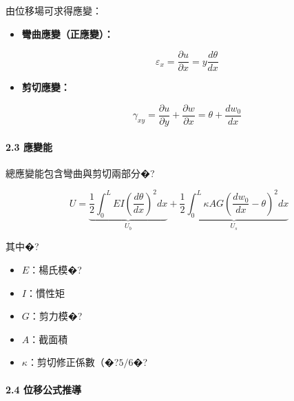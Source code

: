 \documentclass[UTF8, a4paper, 12pt]{ctexart}
\begin{document}
由位移場可求得應變：



\begin{itemize}

    \item \textbf{彎曲應變（正應變）：}

    $$\varepsilon_x = \frac{\partial u}{\partial x} = y \frac{d\theta}{dx}$$

    

    \item \textbf{剪切應變：}

    $$\gamma_{xy} = \frac{\partial u}{\partial y} + \frac{\partial w}{\partial x} = \theta + \frac{dw_0}{dx}$$

\end{itemize}



\paragraph{2.3 應變能}



總應變能包含彎曲與剪切兩部分�?



$$U = \underbrace{\frac{1}{2}\int_0^L EI\left(\frac{d\theta}{dx}\right)^2 dx}_{U_b} + \underbrace{\frac{1}{2}\int_0^L \kappa AG\left(\frac{dw_0}{dx} - \theta\right)^2 dx}_{U_s}$$



其中�?

\begin{itemize}

    \item $E$：楊氏模�?

    \item $I$：慣性矩

    \item $G$：剪力模�?

    \item $A$：截面積

    \item $\kappa$：剪切修正係數（�?$5/6$�?

\end{itemize}



\paragraph{2.4 位移公式推導}
\end{document}
